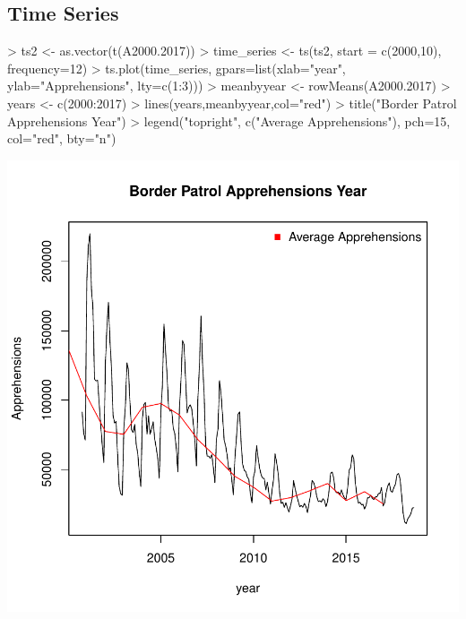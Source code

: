 \documentclass[letterpaper]{article}
\begin{document}
\subsection{Time Series}
\begin{Schunk}
\begin{Sinput}
> ts2 <- as.vector(t(A2000.2017))
> time_series <- ts(ts2, start = c(2000,10), frequency=12)
> ts.plot(time_series, gpars=list(xlab="year", ylab="Apprehensions", lty=c(1:3)))
> meanbyyear <- rowMeans(A2000.2017)
> years <- c(2000:2017)
> lines(years,meanbyyear,col="red")
> title("Border Patrol Apprehensions Year")
> legend("topright", c("Average Apprehensions"), pch=15,  col="red",  bty="n")
\end{Sinput}
\end{Schunk}
\includegraphics{Document-009}
\end{document}
